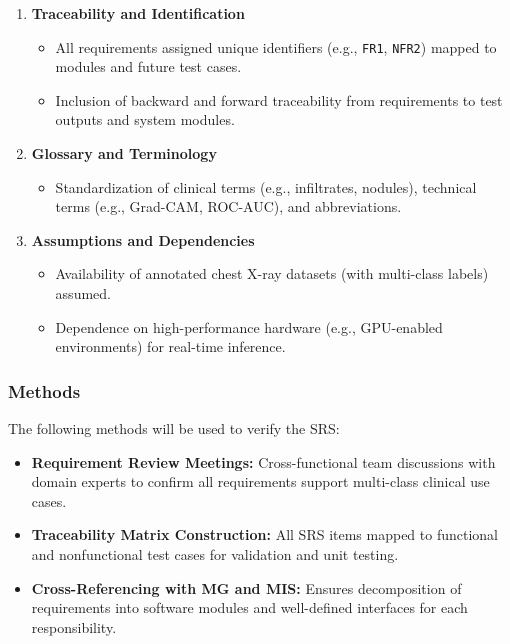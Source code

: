 \documentclass[12pt, titlepage]{article}
\begin{document}
\begin{enumerate}
  \item \textbf{Traceability and Identification}
    \begin{itemize}
      \item All requirements assigned unique identifiers (e.g., \texttt{FR1}, \texttt{NFR2}) mapped to modules and future test cases.
      \item Inclusion of backward and forward traceability from requirements to test outputs and system modules.
    \end{itemize}
  \item \textbf{Glossary and Terminology}
    \begin{itemize}
      \item Standardization of clinical terms (e.g., infiltrates, nodules), technical terms (e.g., Grad-CAM, ROC-AUC), and abbreviations.
    \end{itemize}
  \item \textbf{Assumptions and Dependencies}
    \begin{itemize}
      \item Availability of annotated chest X-ray datasets (with multi-class labels) assumed.
      \item Dependence on high-performance hardware (e.g., GPU-enabled environments) for real-time inference.
    \end{itemize}
\end{enumerate}

\subsubsection{Methods}
The following methods will be used to verify the SRS:
\begin{itemize}
  \item \textbf{Requirement Review Meetings:} Cross-functional team discussions with domain experts to confirm all requirements support multi-class clinical use cases.
  \item \textbf{Traceability Matrix Construction:} All SRS items mapped to functional and nonfunctional test cases for validation and unit testing.
  \item \textbf{Cross-Referencing with MG and MIS:} Ensures decomposition of requirements into software modules and well-defined interfaces for each responsibility.
\end{itemize}
\end{document}
